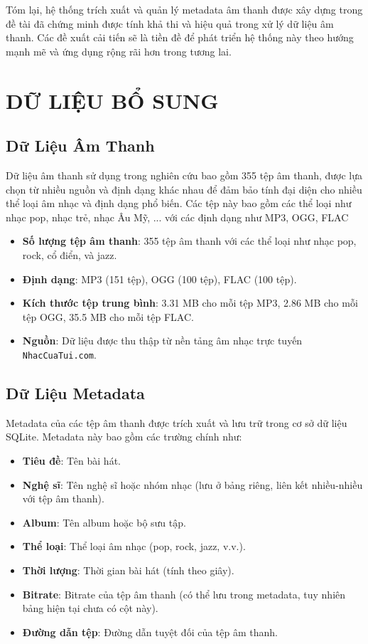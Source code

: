 \documentclass[conference]{IEEEtran}
\begin{document}
Tóm lại, hệ thống trích xuất và quản lý metadata âm thanh được xây dựng trong đề tài đã chứng minh được tính khả thi và hiệu quả trong xử lý dữ liệu âm thanh. Các đề xuất cải tiến sẽ là tiền đề để phát triển hệ thống này theo hướng mạnh mẽ và ứng dụng rộng rãi hơn trong tương lai.

\section{DỮ LIỆU BỔ SUNG}

\subsection{Dữ Liệu Âm Thanh}
Dữ liệu âm thanh sử dụng trong nghiên cứu bao gồm 355 tệp âm thanh, được lựa chọn từ nhiều nguồn và định dạng khác nhau để đảm bảo tính đại diện cho nhiều thể loại âm nhạc và định dạng phổ biến. Các tệp này bao gồm các thể loại như nhạc pop, nhạc trẻ, nhạc Âu Mỹ, ... với các định dạng như MP3, OGG, FLAC
\begin{itemize}
    \item \textbf{Số lượng tệp âm thanh}: 355 tệp âm thanh với các thể loại như nhạc pop, rock, cổ điển, và jazz.
    \item \textbf{Định dạng}: MP3 (151 tệp), OGG (100 tệp), FLAC (100 tệp).
    \item \textbf{Kích thước tệp trung bình}: 3.31 MB cho mỗi tệp MP3, 2.86 MB cho mỗi tệp OGG, 35.5 MB cho mỗi tệp FLAC.
    \item \textbf{Nguồn}: Dữ liệu được thu thập từ nền tảng âm nhạc trực tuyến \texttt{NhacCuaTui.com}.
\end{itemize}

\subsection{Dữ Liệu Metadata}
Metadata của các tệp âm thanh được trích xuất và lưu trữ trong cơ sở dữ liệu SQLite. Metadata này bao gồm các trường chính như:

\begin{itemize}
    \item \textbf{Tiêu đề}: Tên bài hát.
    \item \textbf{Nghệ sĩ}: Tên nghệ sĩ hoặc nhóm nhạc (lưu ở bảng riêng, liên kết nhiều-nhiều với tệp âm thanh).
    \item \textbf{Album}: Tên album hoặc bộ sưu tập.
    \item \textbf{Thể loại}: Thể loại âm nhạc (pop, rock, jazz, v.v.).
    \item \textbf{Thời lượng}: Thời gian bài hát (tính theo giây).
    \item \textbf{Bitrate}: Bitrate của tệp âm thanh (có thể lưu trong metadata, tuy nhiên bảng hiện tại chưa có cột này).
    \item \textbf{Đường dẫn tệp}: Đường dẫn tuyệt đối của tệp âm thanh.
\end{itemize}
\end{document}
